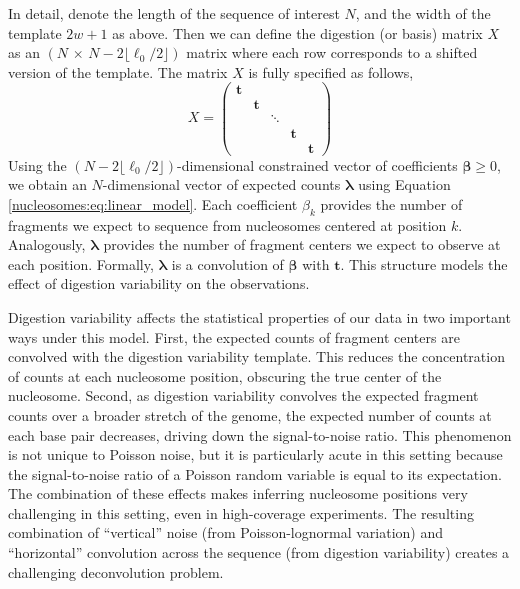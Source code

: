 In detail, denote the length of the sequence of interest $N$, and the width of the template $2w+1$ as above.
%
Then we can define the digestion (or basis) matrix $X$ as an $(N\,\times\,N - 2 \lfloor \ell_0 / 2 \rfloor)$ matrix where each row corresponds to a shifted version of the template.
The matrix $X$ is fully specified as follows,
\begin{equation}
	X = \begin{pmatrix}
	     \bm{t} &&&& \\
	     & \bm{t} &&& \\
	     && \ddots && \\
	     &&& \bm{t} &\\
	     &&&& \bm{t}
	    \end{pmatrix}
\end{equation}
%
Using the $(N - 2 \lfloor \ell_0 / 2 \rfloor)$-dimensional constrained vector of coefficients $\bm
\beta \geq 0$, we obtain an $N$-dimensional vector of expected counts $\bm
\lambda$ using Equation \ref{nucleosomes:eq:linear_model}.
%
Each coefficient $\beta_k$ provides the number of fragments we expect to sequence from nucleosomes centered at position $k$.
%
Analogously, $\bm \lambda$ provides the number of fragment centers we expect to observe at each position.
Formally, $\bm \lambda$ is a convolution of $\bm \beta$ with $\bm t$.
This structure models the effect of digestion variability on the observations.

Digestion variability affects the statistical properties of our data in two important ways under this model.
%
First, the expected counts of fragment centers are convolved with the digestion variability template.
This reduces the concentration of counts at each nucleosome position, obscuring the true center of the nucleosome.
%
Second, as digestion variability convolves the expected fragment counts over a broader stretch of the genome, the expected number of counts at each base pair decreases, driving down the signal-to-noise ratio.
This phenomenon is not unique to Poisson noise, but it is particularly acute in this setting because the signal-to-noise ratio of a Poisson random variable is equal to its expectation.
%
The combination of these effects makes inferring nucleosome positions very challenging in this setting, even in high-coverage experiments.
The resulting combination of ``vertical'' noise (from Poisson-lognormal variation) and ``horizontal'' convolution across the sequence (from digestion variability) creates a challenging deconvolution problem.

